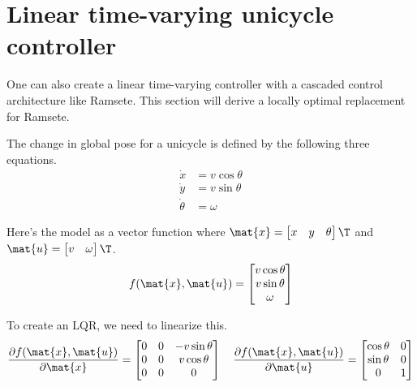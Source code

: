 \section{Linear time-varying unicycle controller}

One can also create a linear time-varying controller with a cascaded control
architecture like Ramsete. This section will derive a locally optimal
replacement for Ramsete.

The change in global pose for a unicycle is defined by the following three
equations.
\begin{align*}
  \dot{x} &= v\cos\theta \\
  \dot{y} &= v\sin\theta \\
  \dot{\theta} &= \omega
\end{align*}

Here's the model as a vector function where
$\mat{x} = \begin{bmatrix} x & y & \theta \end{bmatrix}\T$ and
$\mat{u} = \begin{bmatrix} v & \omega \end{bmatrix}\T$.
\begin{equation}
  f(\mat{x}, \mat{u}) =
  \begin{bmatrix}
    v\cos\theta \\
    v\sin\theta \\
    \omega
  \end{bmatrix}
\end{equation}

To create an LQR, we need to linearize this.
\begin{equation*}
  \frac{\partial f(\mat{x}, \mat{u})}{\partial\mat{x}} =
  \begin{bmatrix}
    0 & 0 & -v\sin\theta \\
    0 & 0 & v\cos\theta \\
    0 & 0 & 0
  \end{bmatrix}
  \quad
  \frac{\partial f(\mat{x}, \mat{u})}{\partial\mat{u}} =
  \begin{bmatrix}
    \cos\theta & 0 \\
    \sin\theta & 0 \\
    0 & 1
  \end{bmatrix}
\end{equation*}


